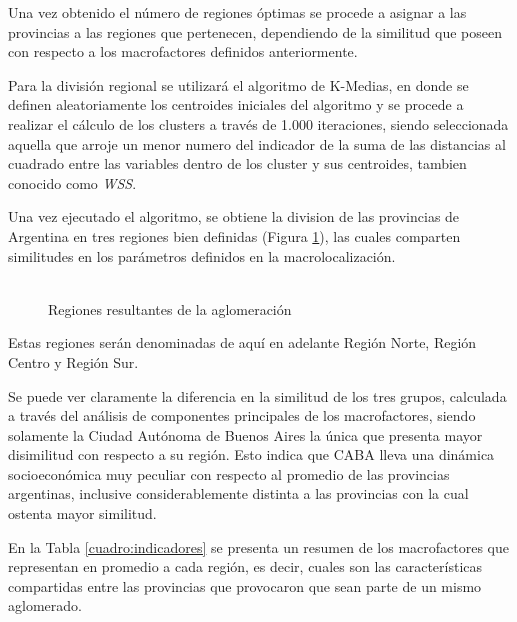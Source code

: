 \documentclass[12pt,a4paper]{article}
\begin{document}
Una vez obtenido el número de regiones óptimas se procede a asignar a las provincias a las regiones que pertenecen, dependiendo de la similitud que poseen con respecto a los macrofactores definidos anteriormente.

Para la división regional se utilizará el algoritmo de K-Medias, en donde se definen aleatoriamente los centroides iniciales del algoritmo y se procede a realizar el cálculo de los clusters a través de 1.000 iteraciones, siendo seleccionada aquella  que arroje un menor numero del indicador de la suma de las distancias al cuadrado entre las variables dentro de  los cluster y sus centroides, tambien conocido como \textit{WSS}.

Una vez ejecutado el algoritmo, se obtiene la division de las provincias de Argentina en tres regiones bien definidas (Figura \ref{figure:reg_resultantes}), las cuales comparten similitudes en los parámetros definidos en la macrolocalización.


\begin{figure}[htbp!]
\begin{center}
\caption{\\Regiones resultantes de la aglomeración}

\label{figure:reg_resultantes}
\end{center}
\end{figure}

Estas regiones serán denominadas de aquí en adelante Región Norte, Región Centro y Región Sur.

Se puede ver claramente la diferencia en la similitud de los tres grupos, calculada a través del análisis de componentes principales de los macrofactores, siendo solamente la Ciudad Autónoma de Buenos Aires la única que presenta mayor disimilitud con respecto a su región.
Esto indica que CABA  lleva una dinámica socioeconómica muy peculiar con respecto al promedio de las provincias argentinas, inclusive considerablemente distinta a las provincias con la cual ostenta mayor similitud.

En la Tabla \ref{cuadro:indicadores} se presenta un resumen de los macrofactores que representan en promedio a cada región, es decir, cuales son las características compartidas entre las provincias que provocaron que sean parte de un mismo aglomerado.
\end{document}

